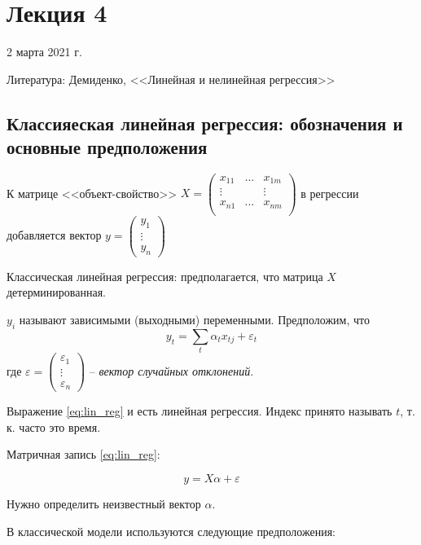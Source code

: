 \documentclass[main.tex]{subfiles}
\begin{document}
\section{Лекция 4}
2 марта 2021 г.

Литература: Демиденко, <<Линейная и нелинейная регрессия>>

\subsection{Классияеская линейная регрессия: обозначения и основные предположения}

К матрице <<объект-свойство>> $ X = \begin{pmatrix}
    x_{11}&  ... & x_{1m} \\
    \vdots & & \vdots \\
    x_{n1}&  ... & x_{nm} \\
\end{pmatrix} $ в регрессии добавляется вектор $ y = \begin{pmatrix}
y_1 \\ \vdots \\ y_n
\end{pmatrix} $

Классическая линейная регрессия: предполагается, что матрица $ X $ детерминированная.

$y_i$ называют зависимыми (выходными) переменными.
Предположим, что
\begin{equation} \label{eq:lin_reg}
    y_t = \sum_t \alpha_t x_{tj} + \varepsilon_t
\end{equation}
 где $\varepsilon = \begin{pmatrix}
    \varepsilon_1 \\ \vdots \\ \varepsilon_n
\end{pmatrix}$ -- \emph{вектор случайных отклонений}.

Выражение \eqref{eq:lin_reg} и есть линейная регрессия.
Индекс принято называть $t$, т. к. часто это время.

Матричная запись \eqref{eq:lin_reg}:

\begin{equation} \label{eq:lin_reg_mtx}
    y = X \alpha + \varepsilon
\end{equation}

Нужно определить неизвестный вектор $ \alpha $.

В классической модели используются следующие предположения:
\end{document}
